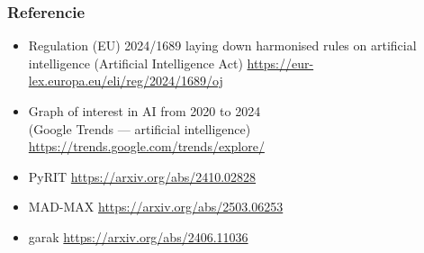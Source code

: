 \begin{frame}
  \frametitle{Referencie}
    \begin{itemize}
      \item Regulation (EU) 2024/1689 laying down harmonised rules on artificial intelligence (Artificial Intelligence Act) \url{https://eur-lex.europa.eu/eli/reg/2024/1689/oj}
      \item Graph of interest in AI from 2020 to 2024\\(Google Trends --- artificial intelligence) \url{https://trends.google.com/trends/explore/}
      \item PyRIT \url{https://arxiv.org/abs/2410.02828}
      \item MAD-MAX \url{https://arxiv.org/abs/2503.06253}
      \item garak \url{https://arxiv.org/abs/2406.11036}
    \end{itemize}
\end{frame}